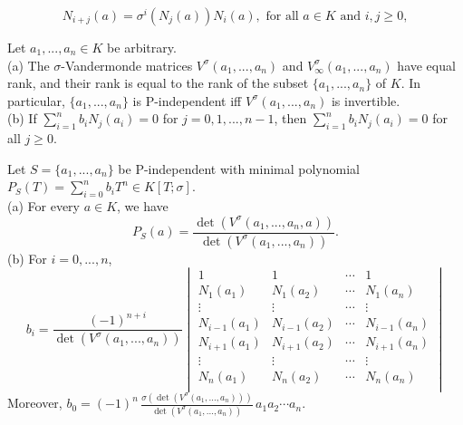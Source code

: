 \documentclass[10pt,a4paper]{amsart}
\newcommand{\s}{\sigma}
\begin{document}
	\begin{equation}\label{(Id)Ni+j}
		N_{i+j}(a)=\sigma^i(N_j(a))N_i(a), \text{ for all } a\in K \text{ and } i,j\geq 0,
	\end{equation}

	\begin{theorem}\label{(T)Vandermonde}
		Let $a_1,...,a_n\in K$ be arbitrary.\\
		(a) The $\s$-Vandermonde matrices $V^\s(a_1,...,a_n)$ and  $V^\s_{\infty}(a_1,...,a_n)$ have equal rank, and their rank is equal to the rank of the subset $\{a_1,...,a_n\}$ of $K$. In particular, $\{a_1,...,a_n\}$ is P-independent iff $V^\s(a_1,...,a_n)$ is invertible. \\
		(b) If $\sum_{i=1}^{n}b_iN_j(a_{i})=0$ for $j=0,1,...,n-1$, then $\sum_{i=1}^{n}b_iN_j(a_{i})=0$ for all $j\geq 0$. 
	\end{theorem}

	\begin{theorem}\label{(T)Vieta}
		Let $S=\{a_1,...,a_n\}$ be P-independent with minimal polynomial $P_S(T)=\sum_{i=0}^nb_i T^n\in K[T;\s]$. \\
		(a) For every $a\in K$, we have
		$$P_S(a)=\frac{ \det \left( V^\s(a_1,...,a_n,a)\right)  }{\det \left( V^\s(a_1,...,a_n)\right) }.$$
		(b) For $i=0,...,n$, 
		\begin{equation}\label{(F)MinimalVandermonde}
			b_i=\frac{(-1)^{n+i}}{\det \left( V^\s(a_1,...,a_n)\right)}\begin{vmatrix}
				1&1&\cdots&1\\
				N_{1}(a_1)&N_{1}(a_2)&\cdots&N_{1}(a_n)\\
				\vdots&\vdots&\cdots&\vdots\\
				N_{i-1}(a_1)&N_{i-1}(a_2)&\cdots&N_{i-1}(a_n)\\
				N_{i+1}(a_1)&N_{i+1}(a_2)&\cdots&N_{i+1}(a_n)\\
				\vdots&\vdots&\cdots&\vdots\\
				N_{n}(a_1)&N_{n}(a_2)&\cdots&N_{n}(a_n)\\
			\end{vmatrix}
		\end{equation}
	Moreover, 
	$b_0=(-1)^{n}\, \frac{\s\left( \det \left( V^\s(a_1,...,a_n)\right)\right) }{\det \left( V^\s(a_1,...,a_n)\right)}\, a_1a_2\cdots a_n.$
	

	\end{theorem}
\end{document}
